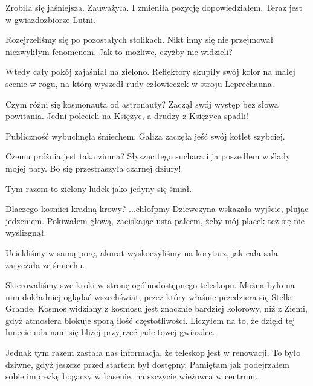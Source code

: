 \begin{dialogue}
	\ds{} Zrobiła się jaśniejsza. \dm{} Zauważyła.
	\ds{} I zmieniła pozycję \dm{} dopowiedziałem. \dm{} Teraz jest w gwiazdozbiorze Lutni.
\end{dialogue}

Rozejrzeliśmy się po pozostałych stolikach. Nikt inny się nie przejmował niezwykłym fenomenem.
Jak to możliwe, czyżby nie widzieli?

Wtedy cały pokój zajaśniał na zielono.
Reflektory skupiły swój kolor na małej scenie w rogu, na którą wyszedł rudy człowieczek w stroju Leprechauna.

\begin{dialogue}
	\ds{} Czym różni się kosmonauta od astronauty? \dm{} Zaczął swój występ bez słowa powitania. \dm{} Jedni polecieli na Księżyc, a drudzy z Księżyca spadli!
\end{dialogue}

Publiczność wybuchnęła śmiechem. Galiza zaczęła jeść swój kotlet szybciej.

\begin{dialogue}
	\ds{} Czemu próżnia jest taka zimna? \dm{} Słysząc tego suchara i ja poszedłem w ślady mojej pary. \dm{} Bo się przestraszyła czarnej dziury!
\end{dialogue}

Tym razem to zielony ludek jako jedyny się śmiał.

\begin{dialogue}
	\ds{} Dlaczego kosmici kradną krowy?
	\ds{} ...chłofpmy \dm{} Dziewczyna wskazała wyjście, plując jedzeniem. Pokiwałem głową, zaciskając usta palcem, żeby mój placek też się nie wyślizgnął.
\end{dialogue}

Uciekliśmy w samą porę, akurat wyskoczyliśmy na korytarz, jak cała sala zaryczała ze śmiechu.

Skierowaliśmy swe kroki w stronę ogólnodostępnego teleskopu.
Można było na nim dokładniej oglądać wszechświat, przez który właśnie przedziera się Stella Grande.
Kosmos widziany z kosmosu jest znacznie bardziej kolorowy, niż z Ziemi, gdyż atmosfera blokuje sporą ilość częstotliwości.
Liczyłem na to, że dzięki tej lunecie uda nam się bliżej przyjrzeć jadeitowej gwiazdce.

Jednak tym razem zastała nas informacja, że teleskop jest w renowacji.
To było dziwne, gdyż jeszcze przed startem był dostępny. Pamiętam jak podejrzałem sobie imprezkę bogaczy w basenie, na szczycie wieżowca w centrum.

